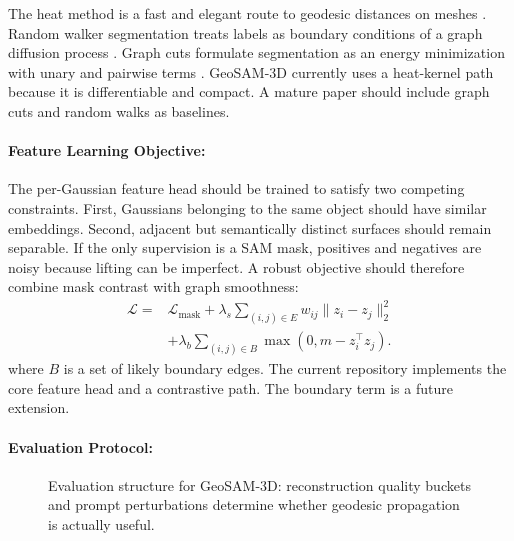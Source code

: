 \documentclass{article}
\begin{document}
The heat method is a fast and elegant route to geodesic distances on meshes \citep{crane2013heat}. Random walker segmentation treats labels as boundary conditions of a graph diffusion process \citep{grady2006random}. Graph cuts formulate segmentation as an energy minimization with unary and pairwise terms \citep{boykov2001interactive}. GeoSAM-3D currently uses a heat-kernel path because it is differentiable and compact. A mature paper should include graph cuts and random walks as baselines.

\paragraph{Feature Learning Objective:}

The per-Gaussian feature head should be trained to satisfy two competing constraints. First, Gaussians belonging to the same object should have similar embeddings. Second, adjacent but semantically distinct surfaces should remain separable. If the only supervision is a SAM mask, positives and negatives are noisy because lifting can be imperfect. A robust objective should therefore combine mask contrast with graph smoothness:
\begin{equation}
\begin{aligned}
\mathcal{L}=&\mathcal{L}_{\text{mask}}
+\lambda_s\sum_{(i,j)\in E}w_{ij}\|z_i-z_j\|_2^2\\
&+\lambda_b\sum_{(i,j)\in B}\max(0,m-z_i^\top z_j).
\end{aligned}
\end{equation}
where $B$ is a set of likely boundary edges. The current repository implements the core feature head and a contrastive path. The boundary term is a future extension.

\paragraph{Evaluation Protocol:}

\begin{figure}[t]
\centering
{}
\caption{Evaluation structure for GeoSAM-3D: reconstruction quality buckets and prompt perturbations determine whether geodesic propagation is actually useful.}
\label{fig:geosam-eval}
\end{figure}
\end{document}
